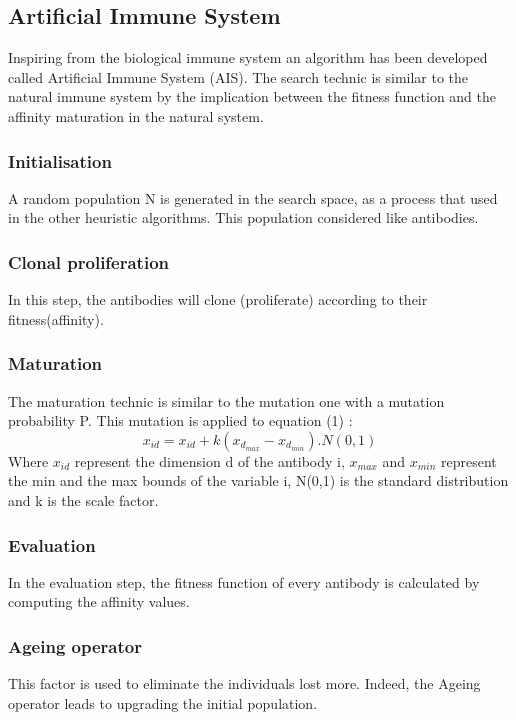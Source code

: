 \documentclass[conference]{IEEEtran}
\begin{document}
\subsection{Artificial Immune System}
Inspiring from the biological immune system an algorithm has been developed called Artificial Immune System (AIS)\cite{doc6}. The search technic is similar to the natural immune system by the implication between the fitness function and the affinity maturation in the natural system.
\subsubsection{Initialisation}
A random population N is generated in the search space, as a process that used in the other heuristic algorithms. This population considered like antibodies.
\subsubsection{Clonal proliferation}
In this step, the antibodies will clone (proliferate) according to their fitness(affinity).
\subsubsection{Maturation}
The maturation technic is similar to the mutation one with a mutation probability P. This mutation is applied to equation (1) : 
\begin{equation}
x_{id} = x_{id} + k(x_{d_{max}} - x_{d_{min}}) . N(0,1)
\end{equation}
Where $x_{id}$ represent the dimension d of the antibody i, $x_{max}$ and $x_{min}$ represent the min and the max bounds of the variable i, N(0,1) is the standard distribution and k is the scale factor.
\subsubsection{Evaluation}
In the evaluation step, the fitness function of every antibody is calculated by computing the affinity values.
\subsubsection{Ageing operator}
This factor is used to eliminate the individuals lost more. Indeed, the Ageing operator leads to upgrading the initial population.
\end{document}

